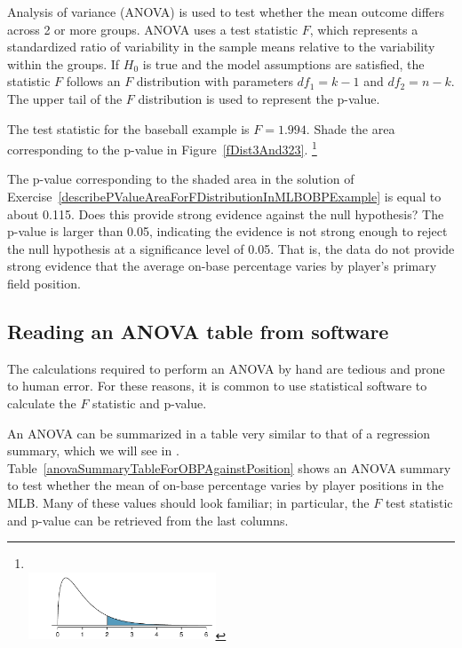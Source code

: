 \begin{termBox}{
Analysis of variance (ANOVA) is used to test whether the mean outcome differs across 2 or more groups. ANOVA uses a test statistic $F$, which represents a standardized ratio of variability in the sample means relative to the variability within the groups. If $H_0$ is true and the model assumptions are satisfied, the statistic $F$ follows an $F$ distribution with parameters $df_{1}=k-1$ and $df_{2}=n-k$. The upper tail of the $F$ distribution is used to represent the p-value.}
\end{termBox}

\begin{exercise}\label{describePValueAreaForFDistributionInMLBOBPExample}
The test statistic for the baseball example is $F=1.994$. Shade the area corresponding to the p-value in Figure~\ref{fDist3And323}. \footnote{\ \vspace{-4mm}\\\includegraphics[height=20mm]{05/figures/fDist3And323/fDist3And323Shaded}}
\end{exercise}

\begin{example}{The p-value corresponding to the shaded area in the solution of Exercise~\ref{describePValueAreaForFDistributionInMLBOBPExample} is equal to about 0.115. Does this provide strong evidence against the null hypothesis?}
The p-value is larger than 0.05, indicating the evidence is not strong enough to reject the null hypothesis at a significance level of 0.05. That is, the data do not provide strong evidence that the average on-base percentage varies by player's primary field position.
\end{example}


\subsection{Reading an ANOVA table from software}

The calculations required to perform an ANOVA by hand are tedious and prone to human error. For these reasons, it is common to use statistical software to calculate the $F$ statistic and p-value.

An ANOVA can be summarized in a table very similar to that of a regression summary, which we will see in . Table~\ref{anovaSummaryTableForOBPAgainstPosition} shows an ANOVA summary to test whether the mean of on-base percentage varies by player positions in the MLB. Many of these values should look familiar; in particular, the $F$ test statistic and p-value can be retrieved from the last columns.

